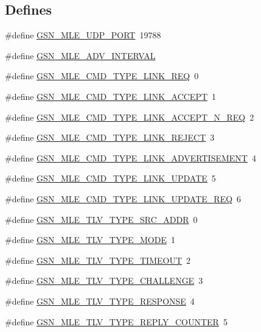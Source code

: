 \subsection*{Defines}
\begin{DoxyCompactItemize}
\item 
\#define \hyperlink{a00527_ad68e324de02af9d3b7b52ed890fb06b7}{GSN\_\-MLE\_\-UDP\_\-PORT}~19788
\item 
\#define \hyperlink{a00527_a5244d0b132f1b7ff1249cc8d4230047a}{GSN\_\-MLE\_\-ADV\_\-INTERVAL}
\item 
\#define \hyperlink{a00527_a7665e58f1aaf7053d4d670b220d1ce72}{GSN\_\-MLE\_\-CMD\_\-TYPE\_\-LINK\_\-REQ}~0
\item 
\#define \hyperlink{a00527_abb17d914caf5e73c27e832ccde5117f9}{GSN\_\-MLE\_\-CMD\_\-TYPE\_\-LINK\_\-ACCEPT}~1
\item 
\#define \hyperlink{a00527_a7cfcbafeb3d1403454fb38d75befe421}{GSN\_\-MLE\_\-CMD\_\-TYPE\_\-LINK\_\-ACCEPT\_\-N\_\-REQ}~2
\item 
\#define \hyperlink{a00527_a8694fcff6175af65bb59227344bd9a76}{GSN\_\-MLE\_\-CMD\_\-TYPE\_\-LINK\_\-REJECT}~3
\item 
\#define \hyperlink{a00527_a4cfc5b0b258639000f20965f29c391a8}{GSN\_\-MLE\_\-CMD\_\-TYPE\_\-LINK\_\-ADVERTISEMENT}~4
\item 
\#define \hyperlink{a00527_a20f420343d8b5161b4fcc1450247b912}{GSN\_\-MLE\_\-CMD\_\-TYPE\_\-LINK\_\-UPDATE}~5
\item 
\#define \hyperlink{a00527_a756d9b90bdbd777f4ed78e783dc52514}{GSN\_\-MLE\_\-CMD\_\-TYPE\_\-LINK\_\-UPDATE\_\-REQ}~6
\item 
\#define \hyperlink{a00527_a390c041d3ab533aa2a2c74903273eaaf}{GSN\_\-MLE\_\-TLV\_\-TYPE\_\-SRC\_\-ADDR}~0
\item 
\#define \hyperlink{a00527_af299f11b556f92e136368ca99f6c54e2}{GSN\_\-MLE\_\-TLV\_\-TYPE\_\-MODE}~1
\item 
\#define \hyperlink{a00527_afdfe6e60800cfba332463eae2c77145c}{GSN\_\-MLE\_\-TLV\_\-TYPE\_\-TIMEOUT}~2
\item 
\#define \hyperlink{a00527_a533303f595f2cb62527b50ce8f970094}{GSN\_\-MLE\_\-TLV\_\-TYPE\_\-CHALLENGE}~3
\item 
\#define \hyperlink{a00527_a1b3a4f1f292cae9ace464952b5551d93}{GSN\_\-MLE\_\-TLV\_\-TYPE\_\-RESPONSE}~4
\item 
\#define \hyperlink{a00527_a62e030466464f857e8ee94510302b390}{GSN\_\-MLE\_\-TLV\_\-TYPE\_\-REPLY\_\-COUNTER}~5
\item 

\end{DoxyCompactItemize}
